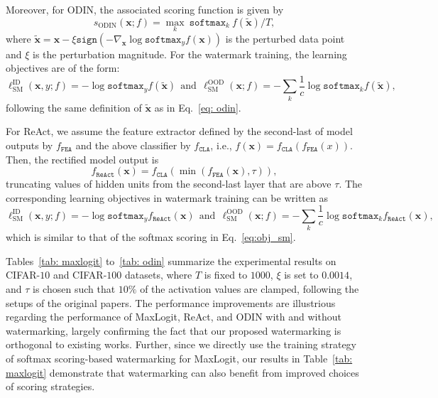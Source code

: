 \documentclass{article}
\begin{document}
Moreover, for ODIN, the associated scoring function is given by
\begin{equation}
    s_\text{ODIN}(\boldsymbol{x};f) = \max_k~\texttt{softmax}_k~f(\boldsymbol{\tilde{x}}) / T,  \label{eq: odin}
\end{equation}
where $\boldsymbol{\tilde{x}}=\boldsymbol{{x}}-{\xi}\texttt{sign}(-\nabla_{\boldsymbol{x}}\log \texttt{softmax}_y f(\boldsymbol{x}))$ is the perturbed data point and ${\xi}$ is the perturbation magnitude. For the watermark training, the learning objectives are of the form:
\begin{equation}
    \ell^\text{ID}_\text{SM}(\boldsymbol{x},y;f)=-\log \texttt{softmax}_y f(\boldsymbol{\tilde{x}})~~\text{and}~~\ell^\text{OOD}_\text{SM}(\boldsymbol{x};f)=-\sum_k \frac{1}{c} \log \texttt{softmax}_k f(\boldsymbol{\tilde{x}}),
\end{equation}
following the same definition of $\boldsymbol{\tilde{x}}$ as in Eq.~\eqref{eq: odin}. 


For ReAct, we assume the feature extractor defined by the second-last of model outputs by $f_\texttt{FEA}$ and the above classifier by $f_\texttt{CLA}$, i.e., $f(\boldsymbol{x})=f_\texttt{CLA}(f_\texttt{FEA}(x))$. Then, the rectified model output is
\begin{equation}
    f_\texttt{ReAct}(\boldsymbol{x})=f_\texttt{CLA}(\min(f_\texttt{FEA}(\boldsymbol{x}),\tau)),
\end{equation}
truncating values of hidden units from the second-last layer that are above $\tau$. The corresponding learning objectives in watermark training can be written as
\begin{equation}
    \ell^\text{ID}_\text{SM}(\boldsymbol{x},y;f)=-\log \texttt{softmax}_y f_\texttt{ReAct}(\boldsymbol{{x}})~~\text{and}~~\ell^\text{OOD}_\text{SM}(\boldsymbol{x};f)=-\sum_k \frac{1}{c} \log \texttt{softmax}_k f_\texttt{ReAct}(\boldsymbol{{x}}),
\end{equation}
which is similar to that of the softmax scoring in Eq.~\eqref{eq:obj_sm}. 



Tables~\ref{tab: maxlogit} to~\ref{tab: odin} summarize the experimental results on CIFAR-$10$ and CIFAR-$100$ datasets, where $T$ is fixed to $1000$, $\xi$ is set to $0.0014$, and $\tau$ is chosen such that $10\%$ of the activation values are clamped, following the setups of the original papers. The performance improvements are illustrious regarding the performance of MaxLogit, ReAct, and ODIN with and without watermarking, largely confirming the fact that our proposed watermarking is orthogonal to existing works. {Further, since we directly use the training strategy of softmax scoring-based watermarking for MaxLogit, our results in Table~\ref{tab: maxlogit} demonstrate that watermarking can also benefit from improved choices of scoring strategies. }
\end{document}
